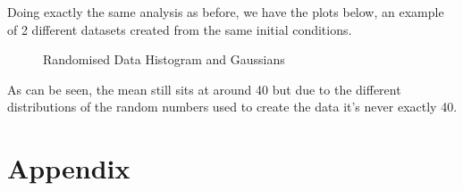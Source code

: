 \documentclass[12pt]{article}
\begin{document}
\begin{itemize}
        Doing exactly the same analysis as before, we have the plots below, an example of 2 different 
        datasets created from the same initial conditions.

        \begin{figure}[H]%
            \centering
            \subfloat{\scalebox{0.45}{}}%
            \qquad
            \subfloat{\scalebox{0.45}{}}%
            \caption{Randomised Data Histogram and Gaussians}
            \label{fig:RandomDataHistograms}
        \end{figure}
        
        \noindent
        As can be seen, the mean still sits at around 40 but due to the different distributions of 
        the random numbers used to create the data it's never exactly 40.


    \end{itemize}
    \newpage
    \section{Appendix}
    \setcounter{figure}{0} \renewcommand{\thefigure}{A.\arabic{figure}}
    
    
    
    
\end{document}
